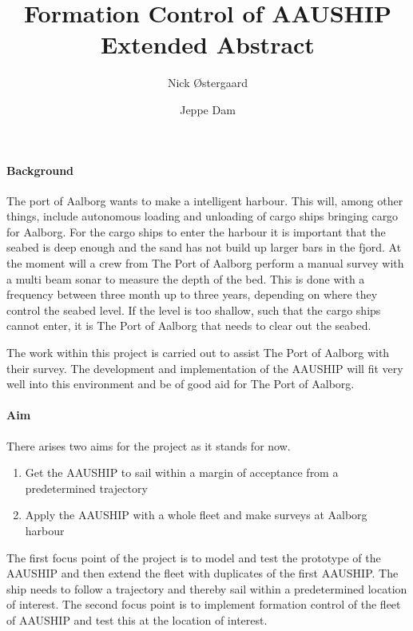 \documentclass[a4paper,12pt]{article}
\begin{document}
\title{\vspace{-2cm}Formation Control of AAUSHIP\\
\vspace{0.3cm}\small{Extended Abstract}}
\author{Nick Østergaard \and Jeppe Dam}
\maketitle


\paragraph{Background}
The port of Aalborg wants to make a intelligent harbour. This will, among other things, include autonomous loading and unloading of cargo ships bringing cargo for Aalborg. For the cargo ships to enter the harbour it is important that the seabed is deep enough and the sand has not build up larger bars in the fjord. At the moment will a crew from The Port of Aalborg perform a manual survey with a multi beam sonar to measure the depth of the bed. This is done with a frequency between three month up to three years, depending on where they control the seabed level. If the level is too shallow, such that the cargo ships cannot enter, it is The Port of Aalborg that needs to clear out the seabed.

The work within this project is carried out to assist The Port of Aalborg with their survey. The development and implementation of the AAUSHIP will fit very well into this environment and be of good aid for The Port of Aalborg.

\paragraph{Aim}
There arises two aims for the project as it stands for now.
\begin{enumerate}
\item Get the AAUSHIP to sail within a margin of acceptance from a predetermined trajectory
\item Apply the AAUSHIP with a whole fleet and make surveys at Aalborg harbour
\end{enumerate}
The first focus point of the project is to model and test the prototype of the AAUSHIP and then extend the fleet with duplicates of the first AAUSHIP. The ship needs to follow a trajectory and thereby sail within a predetermined location of interest. The second focus point is to implement formation control of the fleet of AAUSHIP and test this at the location of interest.
\end{document}
